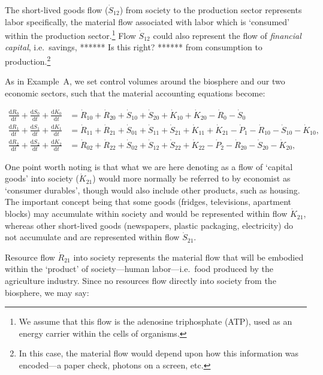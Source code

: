 The short-lived goods flow ($\dot{S}_{12}$) from society to the production sector represents labor
specifically, the material flow associated with labor which is `consumed' within the production
sector.\footnote{We assume that this flow is the adenosine triphosphate (ATP), used as an energy
carrier within the cells of organisms.} Flow $\dot{S}_{12}$ could also represent the flow of 
\emph{financial capital}, i.e.\ savings, ****** Is this right? ****** from consumption to 
production.\footnote{In this case, the material flow would depend upon how this information was 
encoded---a paper check, photons on a screen, etc.}

As in Example~A, we set control volumes around the biosphere 
and our two economic sectors, such that the material accounting equations become:

\begin{align} \label{eq:B_CV_0_to_2}
	\frac{\mathrm{d}R_{0}}{\mathrm{d}t} 
	+ \frac{\mathrm{d}S_{0}}{\mathrm{d}t}	
	+ \frac{\mathrm{d}K_0}{\mathrm{d}t}		&
	=  \dot{R}_{10} + \dot{R}_{20} 
	+ \dot{S}_{10} + \dot{S}_{20} 
	+ \dot{K}_{10} + \dot{K}_{20} 
	- \dot{R}_{0} 
	- \dot{S}_{0} 							\\
	\frac{\mathrm{d}R_{1}}{\mathrm{d}t} 
	+ \frac{\mathrm{d}S_{1}}{\mathrm{d}t}	
	+ \frac{\mathrm{d}K_{1}}{\mathrm{d}t}	&
	=  \dot{R}_{11} 
	+ \dot{R}_{21}
	+ \dot{S}_{01} 
	+ \dot{S}_{11} 
	+ \dot{S}_{21}
	+ \dot{K}_{11}
	+ \dot{K}_{21}
	- \dot{P}_{1} 
	- \dot{R}_{10} 
	- \dot{S}_{10} 
	- \dot{K}_{10},							\\
	\frac{\mathrm{d}R_{2}}{\mathrm{d}t} 
	+ \frac{\mathrm{d}S_{2}}{\mathrm{d}t}
	+ \frac{\mathrm{d}K_{2}}{\mathrm{d}t}	&
	=  \dot{R}_{02} 
	+ \dot{R}_{22} 
	+ \dot{S}_{02} 
	+ \dot{S}_{12} 
	+ \dot{S}_{22} 
	+ \dot{K}_{22}
	- \dot{P}_{2}
	- \dot{R}_{20} 
	- \dot{S}_{20} 
	- \dot{K}_{20},
\end{align}

One point worth noting is that what we are here denoting as a flow of `capital goods'
into society ($\dot{K}_{21}$) would more normally be referred to by economist as `consumer
durables', though would also include other products, such as housing. The important concept
being that some goods (fridges, televisions, apartment blocks) may accumulate within society
and would be represented within flow $\dot{K}_{21}$, whereas other short-lived goods
(newspapers, plastic packaging, electricity) do not accumulate and are represented within
flow $\dot{S}_{21}$.

Resource flow $\dot{R}_{21}$ into society represents the material flow that will be embodied
within the `product' of society---human labor---i.e.~food produced by the agriculture
industry. %
Since no resources flow directly into society from the biosphere, we may say:

